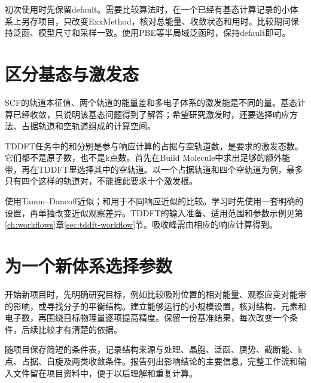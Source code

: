 初次使用时先保留default。需要比较算法时，在一个已经有基态计算记录的小体系上另存项目，只改变ExxMethod，核对总能量、收敛状态和用时。比较期间保持泛函、模型尺寸和采样一致。使用PBE等半局域泛函时，保持default即可。

\section{区分基态与激发态}

SCF的轨道本征值、两个轨道的能量差和多电子体系的激发能是不同的量。基态计算已经收敛，只说明该基态问题得到了解答；希望研究激发时，还要选择响应方法、占据轨道和空轨道组成的计算空间。

TDDFT任务中的和分别是参与响应计算的占据与空轨道数，是要求的激发态数。它们都不是原子数，也不是k点数。首先在Build Molecule中求出足够的额外能带，再在TDDFT里选择其中的空轨道。以一个占据轨道和四个空轨道为例，最多只有四个这样的轨道对，不能据此要求十个激发根。

使用Tamm--Dancoff近似；和用于不同响应近似的比较。学习时先使用一套明确的设置，再单独改变近似观察差异。TDDFT的输入准备、适用范围和参数示例见第\ref{ch:workflows}章\ref{sec:tddft-workflow}节。吸收峰需由相应的响应计算得到。


\section{为一个新体系选择参数}

开始新项目时，先明确研究目标，例如比较吸附位置的相对能量、观察应变对能带的影响，或寻找分子的平衡结构。建立能够运行的小规模设置，核对结构、元素和电子数，再围绕目标物理量逐项提高精度。保留一份基准结果，每次改变一个条件，后续比较才有清楚的依据。

随项目保存简短的条件表，记录结构来源与处理、晶胞、泛函、赝势、截断能、k点、占据、自旋及两类收敛条件。报告列出影响结论的主要信息，完整工作流和输入文件留在项目资料中，便于以后理解和重复计算。
